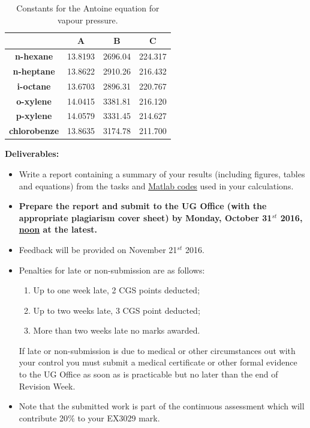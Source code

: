 \documentclass[12pts,a4paper,amsmath,amssymb,floatfix]{article}%
\begin{document}
\begin{enumerate}[label=\bfseries Problem \arabic*:]
\begin{table}[h]
\begin{center}
\begin{tabular}{||c | c c c ||} 
\hline\hline
                           & {\bf A}    &  {\bf B}    & {\bf C}    \\
\hline
{\bf n-hexane}             & 13.8193    & 2696.04     & 224.317    \\  
{\bf n-heptane}            & 13.8622    & 2910.26     & 216.432    \\  
{\bf i-octane}             & 13.6703    & 2896.31     & 220.767    \\  
{\bf o-xylene}             & 14.0415    & 3381.81     & 216.120    \\  
{\bf p-xylene}             & 14.0579    & 3331.45     & 214.627    \\  
{\bf chlorobenze}           & 13.8635    & 3174.78     & 211.700    \\  
\hline\hline
\end{tabular}
\caption{Constants for the Antoine equation for vapour pressure.}
\label{Practical1:Table2}
\end{center}
\end{table}




\end{enumerate}
\clearpage

{\bf Deliverables:}
\begin{itemize}
     \item Write a report containing a summary of your results (including figures, tables and equations) from the tasks and \underline{Matlab codes} used in your calculations. 
%
     \item {\bf Prepare the report and submit to the UG Office (with the appropriate plagiarism cover sheet) by Monday, October 31$^{st}$ 2016, \underline{noon} at the latest.}
%
     \item Feedback will be provided on November 21$^{st}$ 2016.
%
     \item Penalties for late or non-submission are as follows:
        \begin{enumerate}%
            \item Up to one week late, 2 CGS points deducted;
            \item Up to two weeks late, 3 CGS point deducted;
            \item More than two weeks late no marks awarded.
        \end{enumerate}
        If late or non-submission is due to medical or other circumstances out with your control you must submit a medical certificate or other formal evidence to the UG Office as soon as is practicable but no later than the end of Revision Week.
%
    \item Note that the submitted work is part of the continuous assessment which will contribute 20$\%$ to your EX3029 mark.
%
\end{itemize}
\end{document}
